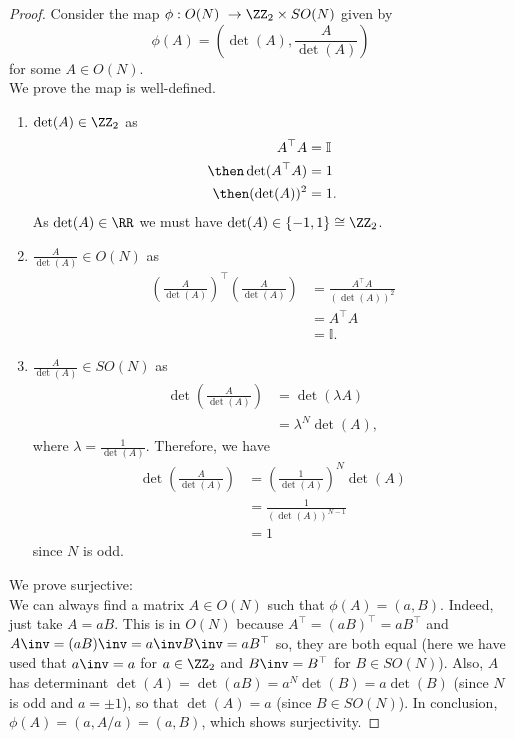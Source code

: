 \documentclass[12pt, a4paper]{article}
\begin{document}
\begin{proof}
    Consider the map \(\phi : O(N)\ \to \ZZ_2 \times SO(N)\) given by
    \[\phi(A)= \left( \det(A), \frac{A}{\det(A)} \right)\]
    for some \(A \in O(N)\). \\
    We prove the map is well-defined.
    \begin{enumerate}
        \item \(\det(A) \in \ZZ_2\) as 
        \[\begin{aligned}
            A^{\top}A &= \mathbb{I} \\
            \then \det(A^{\top}A) &=1 \\
            \then (\det(A))^2 &=1.
        \end{aligned}\]
        As \(\det(A) \in \RR\) we must have \(\det(A) \in \{-1,1\} \cong \ZZ_2\).
        \item \(\frac{A}{\det(A)} \in O(N)\) as 
        \[\begin{aligned}
            \left( \frac{A}{\det(A)} \right)^{\top} \left(\frac{A}{\det(A)}\right) &= \frac{A^{\top}A}{(\det(A))^2} \\
            &= A^{\top}A \\
            &= \mathbb{I}.
        \end{aligned}\]
        \item \(\frac{A}{\det(A)} \in SO(N)\) as 
        \[\begin{aligned}
            \det\left( \frac{A}{\det(A)} \right) &= \det(\lambda A) \\
            &= \lambda^N \det(A),
        \end{aligned}\]
        where \(\lambda = \frac{1}{\det(A)}\). Therefore, we have 
        \[\begin{aligned}
            \det\left( \frac{A}{\det(A)} \right) &= \left( \frac{1}{\det(A)} \right)^N \det(A) \\
            &= \frac{1}{(\det(A))^{N-1}} \\
            &= 1
        \end{aligned}\]
        since \(N\) is odd.
    \end{enumerate}
    We prove surjective: \\
    We can always find a matrix \(A \in O(N)\) such that \(\phi(A)=(a,B)\). Indeed, just take \(A =aB\). This is in \(O(N)\) because \(A^{\top}=(aB)^{\top}=aB^{\top}\) and \(A\inv=(aB)\inv=a\inv B\inv =aB^{\top}\) so, they are both equal (here we have used that \(a\inv = a\) for \(a \in \ZZ_2\) and \(B\inv=B^{\top}\) for \(B \in SO(N)\)). Also, \(A\) has determinant \(\det(A)=\det(aB)=a^N\det(B)=a\det(B)\) (since \(N\) is odd and \(a = \pm 1\)), so that \(\det(A)=a\) (since \(B \in SO(N)\)). In conclusion, \(\phi(A)=(a,A/a)=(a,B)\), which shows surjectivity.
\end{proof}
\end{document}
